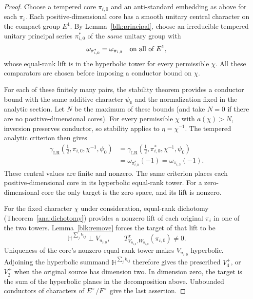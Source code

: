 \begin{proof}
Choose a tempered core $\pi_{i,0}$ and an anti-standard embedding as above
for each $\pi_i$. Each positive-dimensional core has a smooth unitary
central character on the compact group $E^1$. By
Lemma~\ref{blk:principal}, choose an irreducible tempered unitary principal
series $\pi_{i,0}^*$ of the \emph{same} unitary group with
\[
 \omega_{\pi_{i,0}^*}=\omega_{\pi_{i,0}}
                  \quad\hbox{on all of }E^1,
\]
whose equal-rank lift is in the hyperbolic tower for every permissible
$\chi$. All these comparators are chosen before imposing a conductor
bound on $\chi$.

For each of these finitely many pairs, the stability theorem
\cite[Proposition~5.3]{FinisLapid} provides a conductor bound with
the same additive character $\psi_0$ and the normalization fixed
in the analytic section. Let $N$ be the maximum of these bounds (and take $N=0$ if there are no positive-dimensional
cores). For every permissible $\chi$ with $a(\chi)>N$, inversion preserves
conductor, so stability applies to $\eta=\chi^{-1}$. The tempered analytic
criterion then gives
\begin{align*}
 \gamma_{\mathrm{LR}}\!\left(\tfrac12,\pi_{i,0},\chi^{-1},
                         \psi_0\right)
 &=\gamma_{\mathrm{LR}}\!\left(\tfrac12,\pi_{i,0}^*,\chi^{-1},
                         \psi_0\right)\\
 &=\omega_{\pi_{i,0}^*}(-1)
  =\omega_{\pi_{i,0}}(-1).
\end{align*}
These central values are finite and nonzero. The same criterion places
each positive-dimensional core in its hyperbolic equal-rank tower.
For a zero-dimensional core the only target is the zero space, and its
lift is nonzero.

For the fixed character $\chi$ under consideration, equal-rank dichotomy
(Theorem~\ref{ana:dichotomy}) provides a nonzero lift of each original
$\pi_i$ in one of the two towers. Lemma~\ref{blk:remove} forces
the target of that lift to be
\[
 \mathbb H^{\sum_j k_{ij}}\perp V_{n_{i,0}},
 \qquad T^{\chi}_{V_{n_{i,0}},W_{n_{i,0}}}(\pi_{i,0})\ne0.
\]
Uniqueness of the core's nonzero equal-rank tower makes $V_{n_{i,0}}$
hyperbolic. Adjoining the hyperbolic summand $\mathbb H^{\sum_j k_{ij}}$ therefore gives
the prescribed $V_4^+$, or $V_2^+$ when the original source has dimension two. In
dimension zero, the target is the sum of the hyperbolic planes
in the decomposition above.
Unbounded conductors of characters of $E^\times/F^\times$ give the last
assertion.
\end{proof}

